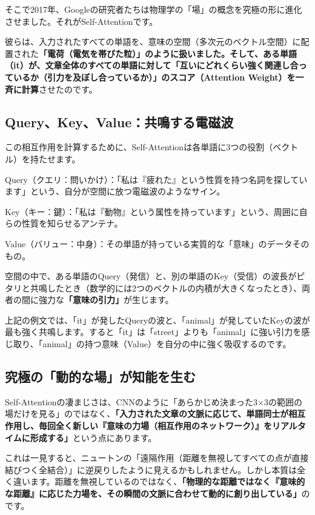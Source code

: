 そこで2017年、Googleの研究者たちは物理学の「場」の概念を究極の形に進化させました。それがSelf-Attentionです。

彼らは、入力されたすべての単語を、意味の空間（多次元のベクトル空間）に配置された\textbf{「電荷（電気を帯びた粒）」のように扱いました。そして、ある単語（it）が、文章全体のすべての単語に対して「互いにどれくらい強く関連し合っているか（引力を及ぼし合っているか）」のスコア（Attention Weight）を一斉に計算}させたのです。

\subsection{Query、Key、Value：共鳴する電磁波}

この相互作用を計算するために、Self-Attentionは各単語に3つの役割（ベクトル）を持たせます。

Query（クエリ：問いかけ）：「私は『疲れた』という性質を持つ名詞を探しています」という、自分が空間に放つ電磁波のようなサイン。

Key（キー：鍵）：「私は『動物』という属性を持っています」という、周囲に自らの性質を知らせるアンテナ。

Value（バリュー：中身）：その単語が持っている実質的な「意味」のデータそのもの。

空間の中で、ある単語のQuery（発信）と、別の単語のKey（受信）の波長がピタリと共鳴したとき（数学的には2つのベクトルの内積が大きくなったとき）、両者の間に強力な\textbf{「意味の引力」}が生じます。

上記の例文では、「it」が発したQueryの波と、「animal」が発していたKeyの波が最も強く共鳴します。すると「it」は「street」よりも「animal」に強い引力を感じ取り、「animal」の持つ意味（Value）を自分の中に強く吸収するのです。

\subsection{究極の「動的な場」が知能を生む}

Self-Attentionの凄まじさは、CNNのように「あらかじめ決まった3×3の範囲の場だけを見る」のではなく、\textbf{「入力された文章の文脈に応じて、単語同士が相互作用し、毎回全く新しい『意味の力場（相互作用のネットワーク）』をリアルタイムに形成する」}という点にあります。

これは一見すると、ニュートンの「遠隔作用（距離を無視してすべての点が直接結びつく全結合）」に逆戻りしたように見えるかもしれません。しかし本質は全く違います。距離を無視しているのではなく、\textbf{「物理的な距離ではなく『意味的な距離』に応じた力場を、その瞬間の文脈に合わせて動的に創り出している」}のです。

